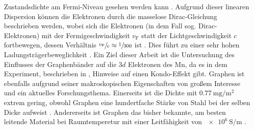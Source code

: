Zustandsdichte am Fermi-Niveau gesehen werden kann \cite{10.1093/nsr/nwu080}. 
Aufgrund dieser linearen Dispersion können die Elektronen durch die masselose Dirac-Gleichung beschrieben werden, wobei sich 
die Elektronen (in dem Fall sog. Dirac-Elektronen) mit der Fermigeschwindigkeit $v_\text{F}$ statt der Lichtgeschwindigkeit $c$ fortbewegen,
dessen Verhältnis $\sfrac{v_\text{F}}{c} \approx \sfrac{1}{300}$ ist \cite{Avouris2007}.
Dies führt zu einer sehr hohen Ladungsträgerbeweglichkeit \cite{https://doi.org/10.1002/adma.201201482}.
Ein Ziel dieser Arbeit ist die Untersuchung des Einflusses der Graphenbänder auf die $3d$ Elektronen des Mn, da es in dem Experiment, 
beschrieben in \cite{doi:10.1021/acsnano.1c00139}, Hinweise auf einen Kondo-Effekt gibt.
Graphen ist ebenfalls aufgrund seiner makroskopischen Eigenschaften von großem Interesse und ein aktuelles Forschungsthema.
Einerseits ist die  Dichte mit $\qty{0.77}{\milli\gram\per\metre\squared}$ extrem gering, obwohl 
Graphen eine hundertfache Stärke von Stahl bei der selben Dicke aufweist \cite{graphene_properties}. 
Andererseits ist Graphen das bisher bekannte, am besten leitende Material bei Raumtemperetur mit einer Leitfähigkeit von 
$\qty{e6}{\siemens\per\metre}$ \cite{graphene_properties}.